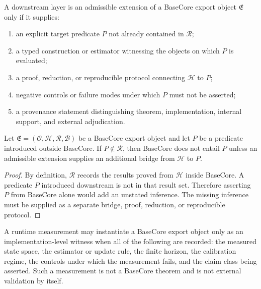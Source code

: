 \begin{definition}
A downstream layer is an admissible extension of a BaseCore export object $\mathfrak{E}$ only if it supplies:
\begin{enumerate}[leftmargin=*]
\item an explicit target predicate $P$ not already contained in $\mathcal{R}$;
\item a typed construction or estimator witnessing the objects on which $P$ is evaluated;
\item a proof, reduction, or reproducible protocol connecting $\mathcal{H}$ to $P$;
\item negative controls or failure modes under which $P$ must not be asserted;
\item a provenance statement distinguishing theorem, implementation, internal support, and external adjudication.
\end{enumerate}
\end{definition}

\begin{proposition}
Let $\mathfrak{E}=(\mathcal{O},\mathcal{H},\mathcal{R},\mathcal{B})$ be a BaseCore export object and let $P$ be a predicate introduced outside BaseCore. If $P\notin\mathcal{R}$, then BaseCore does not entail $P$ unless an admissible extension supplies an additional bridge from $\mathcal{H}$ to $P$.
\end{proposition}

\begin{proof}
By definition, $\mathcal{R}$ records the results proved from $\mathcal{H}$ inside BaseCore. A predicate $P$ introduced downstream is not in that result set. Therefore asserting $P$ from BaseCore alone would add an unstated inference. The missing inference must be supplied as a separate bridge, proof, reduction, or reproducible protocol.
\end{proof}

\begin{criterion}
A runtime measurement may instantiate a BaseCore export object only as an implementation-level witness when all of the following are recorded: the measured state space, the estimator or update rule, the finite horizon, the calibration regime, the controls under which the measurement fails, and the claim class being asserted. Such a measurement is not a BaseCore theorem and is not external validation by itself.
\end{criterion}

